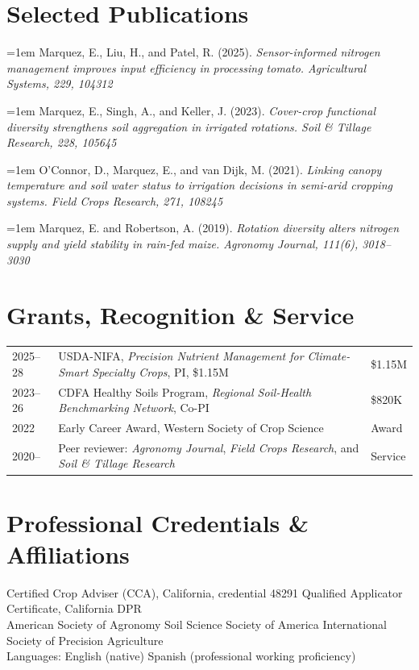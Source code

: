 \documentclass[10pt,letterpaper]{article}
\newcommand{\contactsep}{\enspace\textcolor{Sage}{\textbullet}\enspace}
\newcommand{\publication}[2]{%
  \hangindent=1em\hangafter=1 #1. \textit{#2}\par
}
\begin{document}
\section*{Selected Publications}
\small
\publication{Marquez, E., Liu, H., and Patel, R. (2025)}{Sensor-informed nitrogen management improves input efficiency in processing tomato. Agricultural Systems, 229, 104312}
\vspace{2pt}
\publication{Marquez, E., Singh, A., and Keller, J. (2023)}{Cover-crop functional diversity strengthens soil aggregation in irrigated rotations. Soil \& Tillage Research, 228, 105645}
\vspace{2pt}
\publication{O'Connor, D., Marquez, E., and van Dijk, M. (2021)}{Linking canopy temperature and soil water status to irrigation decisions in semi-arid cropping systems. Field Crops Research, 271, 108245}
\vspace{2pt}
\publication{Marquez, E. and Robertson, A. (2019)}{Rotation diversity alters nitrogen supply and yield stability in rain-fed maize. Agronomy Journal, 111(6), 3018--3030}
\normalsize

\section*{Grants, Recognition \& Service}
\begin{tabularx}{\textwidth}{@{}p{0.62in}X>{\raggedleft\arraybackslash}p{0.65in}@{}}
2025--28 & USDA-NIFA, \textit{Precision Nutrient Management for Climate-Smart Specialty Crops}, PI, \$1.15M & \$1.15M \\
2023--26 & CDFA Healthy Soils Program, \textit{Regional Soil-Health Benchmarking Network}, Co-PI & \$820K \\
2022 & Early Career Award, Western Society of Crop Science & Award \\
2020-- & Peer reviewer: \textit{Agronomy Journal}, \textit{Field Crops Research}, and \textit{Soil \& Tillage Research} & Service
\end{tabularx}

\section*{Professional Credentials \& Affiliations}
Certified Crop Adviser (CCA), California, credential 48291 \contactsep Qualified Applicator Certificate, California DPR\\
American Society of Agronomy \contactsep Soil Science Society of America \contactsep International Society of Precision Agriculture\\
Languages: English (native) \contactsep Spanish (professional working proficiency)
\end{document}
